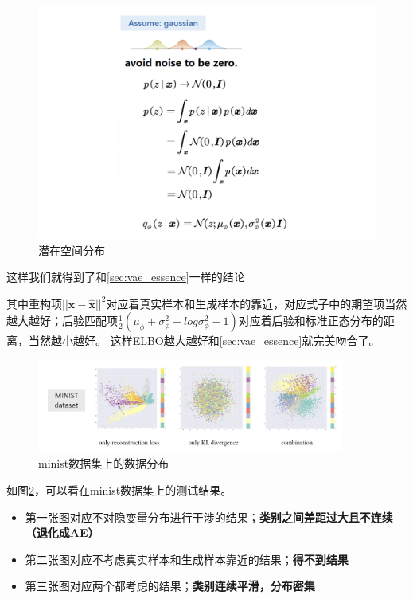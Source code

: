 \begin{figure}[htbp]
    \centering
    \includegraphics[width=\textwidth]{figures/chapter2/assum.png}
    \caption{潜在空间分布}
    \label{fig:vae_assumption}
\end{figure}
这样我们就得到了和\ref{sec:vae_essence}一样的结论

其中重构项$||\boldsymbol{x} - \hat{\boldsymbol{x}}||^2$对应着真实样本和生成样本的靠近，对应式子中的期望项当然越大越好；后验匹配项$\frac{1}{2} (\mu_{\phi} + \sigma_{\phi}^2 - log \sigma_{\phi}^2 - 1)$对应着后验和标准正态分布的距离，当然越小越好。
这样ELBO越大越好和\ref{sec:vae_essence}就完美吻合了。

\begin{figure}[htbp]
    \centering
    \includegraphics[width=0.9\textwidth]{figures/chapter2/data.png}
    \caption{minist数据集上的数据分布}
    \label{fig:vae_data}
\end{figure}
如图\ref{fig:vae_data}，可以看在minist数据集上的测试结果。
\begin{itemize}
    \item 第一张图对应不对隐变量分布进行干涉的结果；\textbf{类别之间差距过大且不连续（退化成AE）}
    \item 第二张图对应不考虑真实样本和生成样本靠近的结果；\textbf{得不到结果}
    \item 第三张图对应两个都考虑的结果；\textbf{类别连续平滑，分布密集}
\end{itemize}

